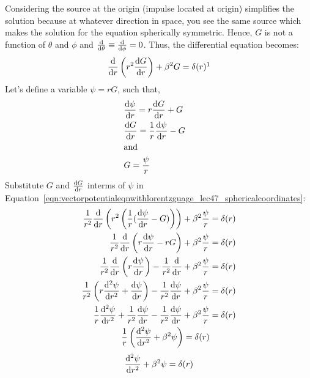 Considering the source at the origin (impulse located at origin) simplifies the solution because at whatever direction in space, you see the same source which makes the solution for the equation spherically symmetric. Hence, $G$ is not a function of $\theta$ and $\phi$ and $\derivative{}{\theta} \equiv \derivative{}{\phi} = 0
$. Thus, the differential equation becomes:
\begin{equation}
\derivative{}{r}\left(r^{2}\derivative{G}{r}\right) +  \beta^{2}G = \delta(r)\footnotemark
\label{eqn:vectorpotentialeqnwithlorentzguage_lec47_sphericalcoordinates}
\end{equation}
Let's define a variable $\psi = rG$, such that,
\begin{align*}
&\derivative{\psi}{r} = r\derivative{G}{r} + G&\\
&\derivative{G}{r} = \frac{1}{r}{\derivative{\psi}{r} - G}&\\
&\text{and}&\\
&G = \frac{\psi}{r}&
\end{align*}
Substitute $G$ and $\derivative{G}{r}$ interms of $\psi$ in Equation~\eqref{eqn:vectorpotentialeqnwithlorentzguage_lec47_sphericalcoordinates}:
\begin{align*}
\frac{1}{r^{2}}\derivative{}{r}\left(r^{2}
\left(\frac{1}{r}(\derivative{\psi}{r} - G) \right) \right) + \beta^{2}\frac{\psi}{r} &= \delta(r)\\
\frac{1}{r^{2}}\derivative{}{r}\left(r\derivative{\psi}{r} - rG \right) + \beta^{2}\frac{\psi}{r} &= \delta(r)\\
\frac{1}{r^{2}}\derivative{}{r}\left(r\derivative{\psi}{r} \right) - \frac{1}{r^{2}}\derivative{}{r}(rG) + \beta^{2}\frac{\psi}{r} &= \delta(r)\\
\frac{1}{r^{2}}\left(r\derivative[2]{\psi}{r} + \derivative{\psi}{r} \right) - \frac{1}{r^{2}}\derivative{\psi}{r} + \beta^{2}\frac{\psi}{r} &= \delta(r)\\
\frac{1}{r}\derivative[2]{\psi}{r} + \frac{1}{r^{2}}\derivative{\psi}{r} - \frac{1}{r^{2}}\derivative{\psi}{r} + \beta^{2}\frac{\psi}{r} &= \delta(r)\\
\frac{1}{r}\left(\derivative[2]{\psi}{r} + \beta^{2}\psi \right) = \delta(r)
\end{align*}
\begin{equation}
\derivative[2]{\psi}{r} + \beta^{2}\psi = \delta(r)\label{eqn:greenfunction}
\end{equation}
